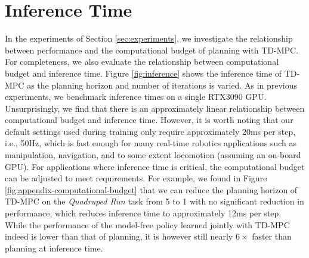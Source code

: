 \documentclass{article}
\begin{document}
\begin{table}
\vspace{-0.05in}
\caption{\textbf{Meta-World MT10.} As our performance metric reported in Figure \ref{fig:metaworld-all} differs from that of the Meta-World \textit{v2} benchmark proposal \citep{yu2019meta}, we here report results for our SAC baseline using the same \textit{maximum per-task success rate} metric used for the MT10 multi-task experiment from the original paper.}
\label{tab:appendix-mt10}
\vspace{0.075in}
\centering
{}
\vspace{-0.025in}
\end{table}

\section{Inference Time}
\label{sec:appendix-inference}
In the experiments of Section \ref{sec:experiments}, we investigate the relationship between performance and the computational budget of planning with TD-MPC. For completeness, we also evaluate the relationship between computational budget and inference time. Figure \ref{fig:inference} shows the inference time of TD-MPC as the planning horizon and number of iterations is varied. As in previous experiments, we benchmark inference times on a single RTX3090 GPU. Unsurprisingly, we find that there is an approximately linear relationship between computational budget and inference time. However, it is worth noting that our default settings used during training only require approximately 20ms per step, i.e., 50Hz, which is fast enough for many real-time robotics applications such as manipulation, navigation, and to some extent locomotion (assuming an on-board GPU). For applications where inference time is critical, the computational budget can be adjusted to meet requirements. For example, we found in Figure \ref{fig:appendix-computational-budget} that we can reduce the planning horizon of TD-MPC on the \textit{Quadruped Run} task from 5 to 1 with no significant reduction in performance, which reduces inference time to approximately 12ms per step. While the performance of the model-free policy learned jointly with TD-MPC indeed is lower than that of planning, it is however still nearly $6\times$ faster than planning at inference time.
\end{document}
